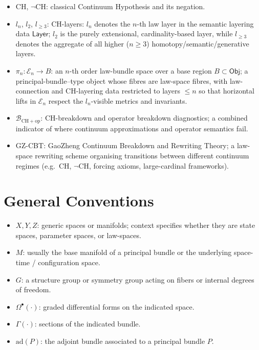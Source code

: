 \documentclass[11pt]{book}
\theoremstyle{plain}
\theoremstyle{definition}
\begin{document}
\begin{itemize}
  \item $\mathrm{CH}$, $\neg\mathrm{CH}$:
        classical Continuum Hypothesis and its negation.
\item $l_n$, $l_2$, $l_{\ge3}$:
        CH-layers: $l_n$ denotes the $n$-th law layer in the semantic
        layering data $\mathsf{Layer}$; $l_2$ is the purely extensional,
        cardinality-based layer, while $l_{\ge3}$ denotes the aggregate
        of all higher ($n\ge3$) homotopy/semantic/generative layers.
\item $\pi_n : \mathcal{E}_n \to B$:
        an $n$-th order law-bundle space over a base region
        $B\subset\mathsf{Obj}$; a principal-bundle--type object whose
        fibres are law-space fibres, with law-connection and CH-layering
        data restricted to layers $\le n$ so that horizontal lifts in
        $\mathcal{E}_n$ respect the $l_n$-visible metrics and
        invariants.
\item $\mathcal{B}_{\mathrm{CH+op}}$:
        CH-breakdown and operator breakdown diagnostics; a combined
        indicator of where continuum approximations and operator
        semantics fail.
\item GZ-CBT:
        GaoZheng Continuum Breakdown and Rewriting Theory; a
        law-space rewriting scheme organising transitions between
        different continuum regimes (e.g.\ CH, $\neg\mathrm{CH}$,
        forcing axioms, large-cardinal frameworks).
\end{itemize}

\section{General Conventions}


\begin{itemize}
  \item $X,Y,Z$:
        generic spaces or manifolds; context specifies whether they
        are state spaces, parameter spaces, or law-spaces.
\item $M$:
        usually the base manifold of a principal bundle or the
        underlying space-time / configuration space.
\item $G$:
        a structure group or symmetry group acting on fibers or
        internal degrees of freedom.
\item $\Omega^\bullet(\cdot)$:
        graded differential forms on the indicated space.
\item $\Gamma(\cdot)$:
        sections of the indicated bundle.
\item $\mathrm{ad}(P)$:
        the adjoint bundle associated to a principal bundle $P$.
\end{itemize}
\end{document}
